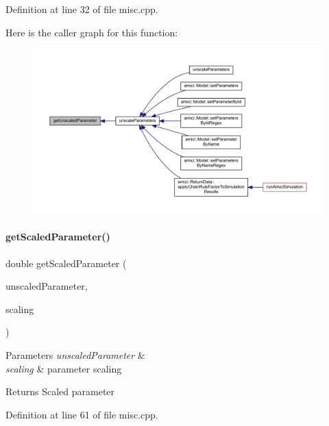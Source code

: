 Definition at line 32 of file misc.\+cpp.

Here is the caller graph for this function\+:
\nopagebreak
\begin{figure}[H]
\begin{center}
\leavevmode
\includegraphics[width=350pt]{namespaceamici_a7e1720941869974da1ca8dbd6cd9e936_icgraph}
\end{center}
\end{figure}
\mbox{\label{namespaceamici_a9ef646fefe61eae18051851bbb2f3e5b}} 
\paragraph{\texorpdfstring{get\+Scaled\+Parameter()}{getScaledParameter()}}
{\footnotesize\ttfamily double get\+Scaled\+Parameter (\begin{DoxyParamCaption}\item[{double}]{unscaled\+Parameter,  }\item[{\mbox{\hyperlink{namespaceamici_a42f062082226e9284c201d9eab71a3a0}{Parameter\+Scaling}}}]{scaling }\end{DoxyParamCaption})}


\begin{DoxyParams}{Parameters}
{\em unscaled\+Parameter} & \\
\hline
{\em scaling} & parameter scaling \\
\hline
\end{DoxyParams}
\begin{DoxyReturn}{Returns}
Scaled parameter 
\end{DoxyReturn}


Definition at line 61 of file misc.\+cpp.

